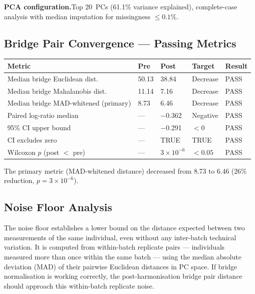 \documentclass[11pt,a4paper]{article}
\begin{document}
\textbf{PCA configuration.}\enspace Top 20~PCs (61.1\% variance explained),
complete-case analysis with median imputation for missingness $\leq 0.1\%$.

\subsection{Bridge Pair Convergence --- Passing Metrics}

{\footnotesize
\renewcommand{\arraystretch}{1.2}
\begin{longtable}{p{5cm}p{2.2cm}p{2.2cm}p{1.5cm}p{1.3cm}}
\toprule
\textbf{Metric} & \textbf{Pre} & \textbf{Post} & \textbf{Target} & \textbf{Result} \\
\midrule
Median bridge Euclidean dist.      & 50.13 & 38.84 & Decrease & PASS \\
Median bridge Mahalanobis dist.    & 11.14 & 7.16  & Decrease & PASS \\
Median bridge MAD-whitened (primary) & 8.73 & 6.46 & Decrease & PASS \\
Paired log-ratio median            & ---   & $-$0.362 & Negative & PASS \\
95\% CI upper bound                & ---   & $-$0.291 & $< 0$    & PASS \\
CI excludes zero                   & ---   & TRUE  & TRUE     & PASS \\
Wilcoxon $p$ (post $<$ pre)        & ---   & $3 \times 10^{-6}$ & $< 0.05$ & PASS \\
\bottomrule
\end{longtable}
\renewcommand{\arraystretch}{1.0}
}

The primary metric (MAD-whitened distance) decreased from 8.73 to 6.46
(26\% reduction, $p = 3 \times 10^{-6}$).

\subsection{Noise Floor Analysis}

The noise floor establishes a lower bound on the distance expected between
two measurements of the same individual, even without any inter-batch
technical variation. It is computed from within-batch replicate pairs ---
individuals measured more than once within the same batch --- using the
median absolute deviation (MAD) of their pairwise Euclidean distances in PC
space. If bridge normalisation is working correctly, the post-harmonisation
bridge pair distance should approach this within-batch replicate noise.
\end{document}
